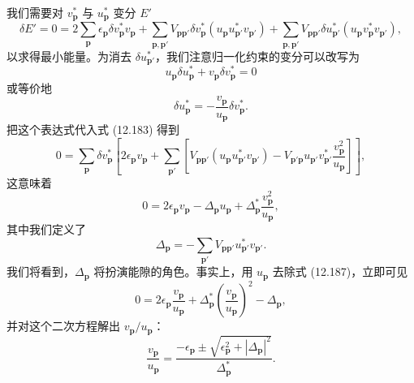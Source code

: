 我们需要对 $v^*_{\mathbf p}$ 与 $u^*_{\mathbf p}$ 变分 $E'$
\begin{equation*}
\delta E'=0=2\sum_{\mathbf p}\epsilon_{\mathbf p}\delta v^*_{\mathbf p}v_{\mathbf p}+\sum_{\mathbf p,\mathbf p'}V_{\mathbf p\mathbf p'}\delta v^*_{\mathbf p}\left(u_{\mathbf p}u^*_{\mathbf p'}v_{\mathbf p'}\right)+\sum_{\mathbf p,\mathbf p'}V_{\mathbf p\mathbf p'}\delta u^*_{\mathbf p'}\left(u_{\mathbf p}v^*_{\mathbf p}v_{\mathbf p'}\right), \tag{12.183}
\end{equation*}
以求得最小能量。为消去 $\delta u^*_{\mathbf p'}$，我们注意归一化约束的变分可以改写为
\begin{equation*}
u_{\mathbf p}\delta u^*_{\mathbf p}+v_{\mathbf p}\delta v^*_{\mathbf p}=0 \tag{12.184}
\end{equation*}
或等价地
\begin{equation*}
\delta u^*_{\mathbf p}=-\frac{v_{\mathbf p}}{u_{\mathbf p}}\delta v^*_{\mathbf p}. \tag{12.185}
\end{equation*}
把这个表达式代入式 (12.183) 得到
\begin{equation*}
0=\sum_{\mathbf p}\delta v^*_{\mathbf p}\left[2\epsilon_{\mathbf p}v_{\mathbf p}+\sum_{\mathbf p'}\left[V_{\mathbf p\mathbf p'}\left(u_{\mathbf p}u^*_{\mathbf p'}v_{\mathbf p'}\right)-V_{\mathbf p'\mathbf p}u_{\mathbf p'}v^*_{\mathbf p'}\frac{v^2_{\mathbf p}}{u_{\mathbf p}}\right]\right], \tag{12.186}
\end{equation*}
这意味着
\begin{equation*}
0=2\epsilon_{\mathbf p}v_{\mathbf p}-\Delta_{\mathbf p}u_{\mathbf p}+\Delta^*_{\mathbf p}\frac{v^2_{\mathbf p}}{u_{\mathbf p}}, \tag{12.187}
\end{equation*}
其中我们定义了
\begin{equation*}
\Delta_{\mathbf p}=-\sum_{\mathbf p'}V_{\mathbf p\mathbf p'}u^*_{\mathbf p'}v_{\mathbf p'}. \tag{12.188}
\end{equation*}
我们将看到，$\Delta_{\mathbf p}$ 将扮演能隙的角色。事实上，用 $u_{\mathbf p}$ 去除式 (12.187)，立即可见
\begin{equation*}
0=2\epsilon_{\mathbf p}\frac{v_{\mathbf p}}{u_{\mathbf p}}+\Delta^*_{\mathbf p}\left(\frac{v_{\mathbf p}}{u_{\mathbf p}}\right)^2-\Delta_{\mathbf p}, \tag{12.189}
\end{equation*}
并对这个二次方程解出 $v_{\mathbf p}/u_{\mathbf p}$：
\begin{equation*}
\frac{v_{\mathbf p}}{u_{\mathbf p}}=\frac{-\epsilon_{\mathbf p}\pm\sqrt{\epsilon^2_{\mathbf p}+\left|\Delta_{\mathbf p}\right|^2}}{\Delta^*_{\mathbf p}}. \tag{12.190}
\end{equation*}
